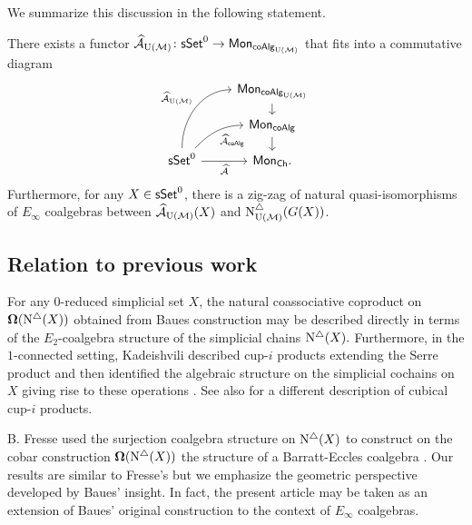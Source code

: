 We summarize this discussion in the following statement.

\begin{theorem} \label{t:2nd main thm in the intro} There exists a functor $\operatorname{\mathcal{\widehat{A}}}_{\operatorname{U}(\mathcal{M})} \colon \mathsf{sSet}^0 \to \mathsf{Mon}_{\mathsf{coAlg}_{\operatorname{U}(\mathcal{M})}}$ that fits into a commutative diagram
	\begin{equation*}
	\begin{tikzcd}[row sep=small]
	& \Mon_{\coAlg_\UM} \arrow[d] \\
	& \Mon_{\coAlg} \arrow[d] \\
	\sSet^0
	\arrow[r, "\Ahat"', ]
	\arrow[ru, "\Ahat_{\coAlg}"', out=45, in=180] 
	\arrow[ruu, "\Ahat_\UM", out=90, in=180]
	& \Mon_{\Ch}.
	\end{tikzcd}
	\end{equation*}
	Furthermore, for any $X \in \mathsf{sSet}^0$, there is a zig-zag of natural quasi-isomorphisms of $E_{\infty}$ coalgebras between $\operatorname{\mathcal{\widehat{A}}}_{\operatorname{U}(\mathcal{M})}(X)$ and $\operatorname{N^{\triangle}_{{\operatorname{U}(\mathcal{M})}}}(G(X))$.
\end{theorem}


\subsection*{Relation to previous work}

For any $0$-reduced simplicial set $X$, the natural coassociative coproduct on $\operatorname{\mathbf{\Omega}} (\operatorname{N^{\triangle}} (X))$ obtained from Baues construction may be described directly in terms of the $E_2$-coalgebra structure of the simplicial chains $\operatorname{N^{\triangle}}(X).$ Furthermore, in the $1$-connected setting, Kadeishvili described cup-$i$ products extending the Serre product and then identified the algebraic structure on the simplicial cochains on $X$ giving rise to these operations \cite{kadeishvili1999coproducts, kadeishvili2003cup-i}.
See also \cite{pilarczyk2016cubical} for a different description of cubical cup-$i$ products.

B. Fresse used the surjection coalgebra structure on $\operatorname{N^{\triangle}}(X)$ to construct on the cobar construction $\operatorname{\mathbf{\Omega}}(\operatorname{N^{\triangle}}(X))$ the  structure of a Barratt-Eccles coalgebra \cite{fresse2003hopf}.
Our results are similar to Fresse's but we emphasize the geometric perspective developed by Baues' insight.
In fact, the present article may be taken as an extension of Baues' original construction to the context of $E_{\infty}$ coalgebras. 

